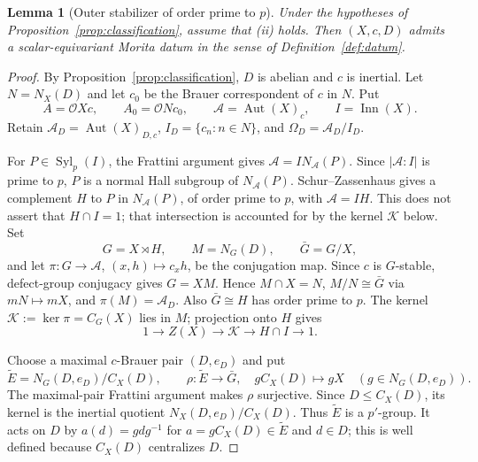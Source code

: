 \documentclass[11pt,a4paper]{article}
\newtheorem{lemma}[theorem]{Lemma}
\theoremstyle{definition}
\theoremstyle{remark}
\numberwithin{equation}{section}
\newcommand{\cO}{\mathcal{O}}
\DeclareMathOperator{\Aut}{Aut}
\DeclareMathOperator{\Inn}{Inn}
\DeclareMathOperator{\Syl}{Syl}
\begin{document}
	\begin{lemma}[Outer stabilizer of order prime to $p$]\label{lem:outer-pprime}
		Under the hypotheses of Proposition~\ref{prop:classification},
		assume that \textup{(ii)} holds. Then $(X,c,D)$ admits a
		scalar-equivariant Morita datum in the sense of
		Definition~\ref{def:datum}.
	\end{lemma}
	\begin{proof}
		By Proposition~\ref{prop:classification}, $D$ is abelian and $c$
		is inertial. Let $N=N_X(D)$ and let $c_0$ be the Brauer
		correspondent of $c$ in $N$. Put
		\[
		A=\cO Xc,\qquad A_0=\cO Nc_0,\qquad
		\mathcal A=\Aut(X)_c,\qquad I=\Inn(X).
		\]
		Retain $\mathcal A_D=\Aut(X)_{D,c}$, $I_D=\{c_n:n\in N\}$,
		and $\Omega_D=\mathcal A_D/I_D$.
		
		For $P\in\Syl_p(I)$, the Frattini argument gives
		$\mathcal A=I N_{\mathcal A}(P)$.
		Since $|\mathcal A:I|$ is prime to $p$, $P$ is a normal Hall
		subgroup of $N_{\mathcal A}(P)$.
		Schur--Zassenhaus gives a complement $H$ to $P$ in
		$N_{\mathcal A}(P)$, of order prime to $p$, with $\mathcal A=IH$.
		This does not assert that $H\cap I=1$; that intersection is
		accounted for by the kernel $\mathcal K$ below. Set
		\[
		G=X\rtimes H,\qquad M=N_G(D),\qquad \bar{G}=G/X,
		\]
		and let $\pi:G\to\mathcal A$, $(x,h)\mapsto c_xh$, be the
		conjugation map. Since $c$ is $G$-stable, defect-group conjugacy
		gives $G=XM$. Hence $M\cap X=N$, $M/N\cong\bar{G}$ via
		$mN\mapsto mX$, and $\pi(M)=\mathcal A_D$.
		Also $\bar{G}\cong H$ has order prime to $p$.
		The kernel $\mathcal K:=\ker\pi=C_G(X)$ lies in $M$;
		projection onto $H$ gives
		\begin{equation}\label{eq:local-kernel-extension}
			1\longrightarrow Z(X)\longrightarrow\mathcal K
			\longrightarrow H\cap I\longrightarrow1.
		\end{equation}
		
		Choose a maximal $c$-Brauer pair $(D,e_D)$ and put
		\[
		\widetilde E=N_G(D,e_D)/C_X(D),\qquad
		\rho:\widetilde E\to\bar{G},\quad gC_X(D)\mapsto gX
		\quad(g\in N_G(D,e_D)).
		\]
		The maximal-pair Frattini argument makes $\rho$ surjective.
		Since $D\leq C_X(D)$, its kernel is the inertial quotient
		$N_X(D,e_D)/C_X(D)$. Thus $\widetilde E$ is a $p'$-group.
		It acts on $D$ by $a(d)=gdg^{-1}$ for
		$a=gC_X(D)\in\widetilde E$ and $d\in D$; this is well defined
		because $C_X(D)$ centralizes $D$.
		

\end{proof}
\end{document}

